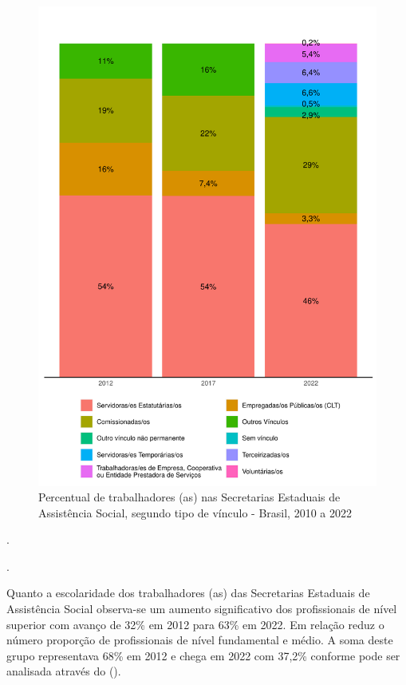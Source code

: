 \documentclass[
  brazilian]{report}
\begin{document}
\begin{figure}
\includegraphics{Censo-SUAS-2022_files/figure-latex/uf_trab_vin-1} \caption[Percentual de trabalhadores (as) nas Secretarias Estaduais de Assistência Social, segundo tipo de vínculo - Brasil, 2010 a 2022]{Percentual de trabalhadores (as) nas Secretarias Estaduais de Assistência Social, segundo tipo de vínculo - Brasil, 2010 a 2022}\label{fig:uf_trab_vin}
\end{figure}

.

.

Quanto a escolaridade dos trabalhadores (as) das Secretarias Estaduais
de Assistência Social observa-se um aumento significativo dos
profissionais de nível superior com avanço de 32\% em 2012 para 63\% em
2022. Em relação reduz o número proporção de profissionais de nível
fundamental e médio. A soma deste grupo representava 68\% em 2012 e
chega em 2022 com 37,2\% conforme pode ser analisada através do
().
\end{document}
